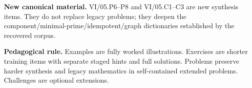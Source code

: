 \bigskip
\noindent\textbf{New canonical material.}
VI/05.P6--P8 and VI/05.C1--C3 are new synthesis items.  They do not replace legacy
problems; they deepen the component/minimal-prime/idempotent/graph dictionaries established
by the recovered corpus.

\bigskip
\noindent\textbf{Pedagogical rule.}
Examples are fully worked illustrations.  Exercises are shorter training items with
separate staged hints and full solutions.  Problems preserve harder synthesis and legacy
mathematics in self-contained extended problems.  Challenges are optional extensions.
